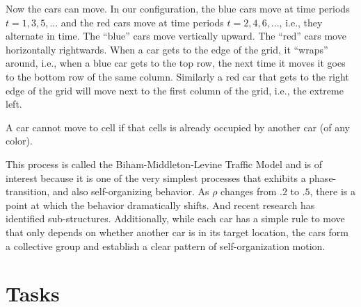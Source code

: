\documentclass{article}
\begin{document}
Now the cars can move.  In our configuration, the blue cars move at
time periods $t = 1, 3, 5, ...$ and the red cars move at time periods
$t = 2, 4, 6, ...$, i.e., they alternate in time.  The ``blue'' cars move
vertically upward.  The ``red'' cars move horizontally rightwards.
When a car gets to the edge of the grid, it ``wraps'' around,
i.e., when a blue car gets to the top row, the next time it moves it goes to the bottom
row of the same column. Similarly a red car that gets to the right edge of the grid will move
next to the first column of the grid, i.e., the extreme left.

A car cannot move to cell if that cells is already occupied by another
car (of any color).

This process is called the Biham-Middleton-Levine Traffic Model and is
of interest because it is one of the very simplest processes that
exhibits a phase-transition, and also self-organizing behavior.  As $\rho$ changes from $.2$ to $.5$,
there is a point at which the behavior dramatically shifts. And recent
research has identified sub-structures.  Additionally, 
while each car has a simple rule to move that only depends on whether another car is in its target
location,  the cars form a collective group and establish a clear pattern of self-organization motion.

\section{Tasks}
\end{document}
